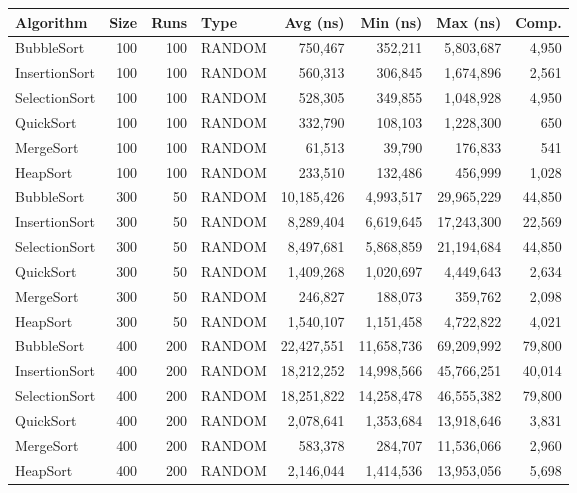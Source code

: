 \documentclass[12pt,a4paper]{article}
\begin{document}
\begin{center}
\scriptsize
\begin{longtable}{lrrlrrrr}
\toprule
\textbf{Algorithm} & \textbf{Size} & \textbf{Runs} & \textbf{Type} &
\textbf{Avg (ns)} & \textbf{Min (ns)} & \textbf{Max (ns)} &
\textbf{Comp.} \\
\midrule
BubbleSort    & 100 & 100 & RANDOM & 750,467   & 352,211  & 5,803,687 & 4,950 \\
InsertionSort & 100 & 100 & RANDOM & 560,313   & 306,845  & 1,674,896 & 2,561 \\
SelectionSort & 100 & 100 & RANDOM & 528,305   & 349,855  & 1,048,928 & 4,950 \\
QuickSort     & 100 & 100 & RANDOM & 332,790   & 108,103  & 1,228,300 & 650   \\
MergeSort     & 100 & 100 & RANDOM & 61,513    & 39,790   & 176,833   & 541   \\
HeapSort      & 100 & 100 & RANDOM & 233,510   & 132,486  & 456,999   & 1,028 \\
\midrule
BubbleSort    & 300 & 50  & RANDOM & 10,185,426 & 4,993,517 & 29,965,229 & 44,850 \\
InsertionSort & 300 & 50  & RANDOM & 8,289,404  & 6,619,645 & 17,243,300 & 22,569 \\
SelectionSort & 300 & 50  & RANDOM & 8,497,681  & 5,868,859 & 21,194,684 & 44,850 \\
QuickSort     & 300 & 50  & RANDOM & 1,409,268  & 1,020,697 & 4,449,643  & 2,634  \\
MergeSort     & 300 & 50  & RANDOM & 246,827    & 188,073   & 359,762    & 2,098  \\
HeapSort      & 300 & 50  & RANDOM & 1,540,107  & 1,151,458 & 4,722,822  & 4,021  \\
\midrule
BubbleSort    & 400 & 200 & RANDOM & 22,427,551 & 11,658,736 & 69,209,992 & 79,800 \\
InsertionSort & 400 & 200 & RANDOM & 18,212,252 & 14,998,566 & 45,766,251 & 40,014 \\
SelectionSort & 400 & 200 & RANDOM & 18,251,822 & 14,258,478 & 46,555,382 & 79,800 \\
QuickSort     & 400 & 200 & RANDOM & 2,078,641  & 1,353,684  & 13,918,646 & 3,831  \\
MergeSort     & 400 & 200 & RANDOM & 583,378    & 284,707    & 11,536,066 & 2,960  \\
HeapSort      & 400 & 200 & RANDOM & 2,146,044  & 1,414,536  & 13,953,056 & 5,698  \\
\bottomrule
\end{longtable}
\end{center}
\end{document}
